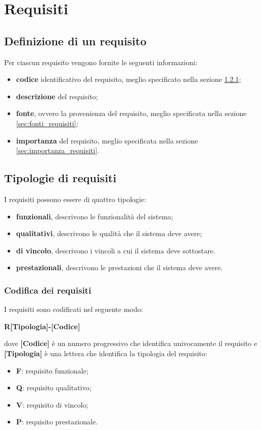 \section{Requisiti}
\subsection{Definizione di un requisito}
Per ciascun requisito vengono fornite le seguenti informazioni:
\begin{itemize}
	\item \textbf{codice} identificativo del requisito, meglio specificato nella sezione \ref{sec:codifica_requisiti};
	\item \textbf{descrizione} del requisito;
	\item \textbf{fonte}, ovvero la provenienza del requisito, meglio specificata nella sezione \ref{sec:fonti_requisiti};
	\item \textbf{importanza} del requisito, meglio specificata nella sezione \ref{sec:importanza_requisiti}.
\end{itemize}

\subsection{Tipologie di requisiti}
I requisiti possono essere di quattro tipologie:
\begin{itemize}
	\item \textbf{funzionali}, descrivono le funzionalità del sistema;
	\item \textbf{qualitativi}, descrivono le qualità che il sistema deve avere;
	\item \textbf{di vincolo}, descrivono i vincoli a cui il sistema deve sottostare.
	\item \textbf{prestazionali}, descrivono le prestazioni che il sistema deve avere.
\end{itemize}

\subsubsection{Codifica dei requisiti}
\label{sec:codifica_requisiti}
I requisiti sono codificati nel seguente modo:
\begin{center}
	\textbf{R[Tipologia]-[Codice]}
\end{center}
dove \textbf{[Codice]} è un numero progressivo che identifica univocamente il requisito
e \textbf{[Tipologia]} è una lettera che identifica la tipologia del requisito:
\begin{itemize}
	\item \textbf{F}: requisito funzionale;
	\item \textbf{Q}: requisito qualitativo;
	\item \textbf{V}: requisito di vincolo;
	\item \textbf{P}: requisito prestazionale.
\end{itemize}

